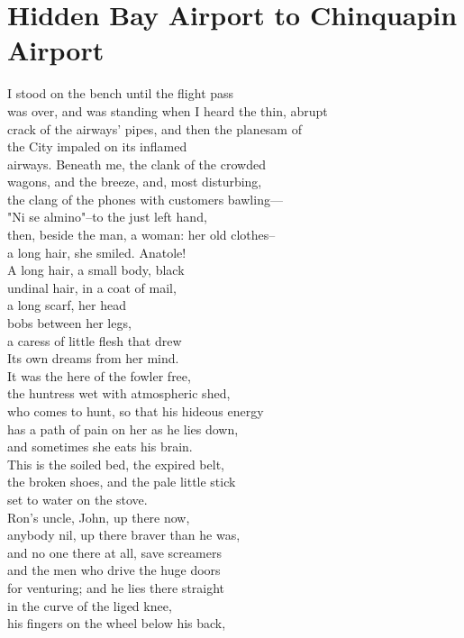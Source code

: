 \documentclass[smalldemyvopaper,11pt,twoside,onecolumn,openright,extrafontsizes]{memoir}
\begin{document}
\chapter{Hidden Bay Airport to Chinquapin Airport}
I stood on the bench until the flight pass
\\was over, and was standing when I heard the thin, abrupt
\\crack of the airways' pipes, and then the planesam of
\\the City impaled on its inflamed
\\airways. Beneath me, the clank of the crowded
\\wagons, and the breeze, and, most disturbing,
\\the clang of the phones with customers bawling—
\\"Ni se almino"--to the just left hand,
\\then, beside the man, a woman: her old clothes--
\\a long hair, she smiled. Anatole!
\\A long hair, a small body, black
\\undinal hair, in a coat of mail,
\\a long scarf, her head
\\bobs between her legs,
\\a caress of little flesh that drew
\\Its own dreams from her mind.
\\It was the here of the fowler free,
\\the huntress wet with atmospheric shed,
\\who comes to hunt, so that his hideous energy
\\has a path of pain on her as he lies down,
\\and sometimes she eats his brain.
\\This is the soiled bed, the expired belt,
\\the broken shoes, and the pale little stick
\\set to water on the stove.
\\Ron's uncle, John, up there now,
\\anybody nil, up there braver than he was,
\\and no one there at all, save screamers
\\and the men who drive the huge doors
\\for venturing; and he lies there straight
\\in the curve of the liged knee,
\\his fingers on the wheel below his back,
\end{document}
